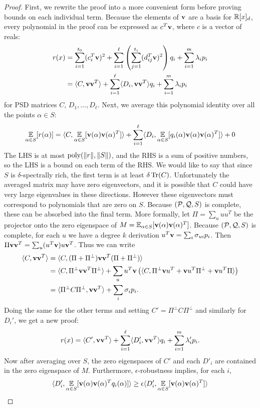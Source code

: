 \begin{proof}
First, we rewrite the proof into a more convenient form before proving bounds on each individual term. Because the elements of ${\bf v}$ are a basis for $\mathbb R[x]_d$, every polynomial in the proof can be expressed as $c^T{\bf v}$, where $c$ is a vector of reals:
\begin{align*} r(x) &= \sum_{i=1}^{t_0} (c_i^T{\bf v})^2 + \sum_{i=1}^\ell \left(\sum_{j=1}^{t_i} (d_{ij}^T{\bf v})^2\right)q_i + \sum_{i=1}^m \lambda_i p_i \\
&= \langle C, {\bf v}{\bf v}^T\rangle + \sum_{i=1}^\ell \langle D_i, {\bf v}{\bf v}^T\rangle q_i + \sum_{i=1}^m \lambda_i p_i
\end{align*}
for PSD matrices $C$, $D_1,\dots,D_\ell$. Next, we average this polynomial identity over all the points $\alpha \in S$:
\begin{align*}
\operatorname*{\mathbb{E}}_{\alpha \in S}[r(\alpha)] &= \langle C, \operatorname*{\mathbb{E}}_{\alpha \in S}[{\bf v}(\alpha){\bf v}(\alpha)^T]\rangle + \sum_{i=1}^\ell \langle D_i, \operatorname*{\mathbb{E}}_{\alpha \in S}[q_i(\alpha){\bf v}(\alpha){\bf v}(\alpha)^T]\rangle + 0 \\
\end{align*}
The LHS is at most $\operatorname{poly}(\|r\|, \|S\|)$, and the RHS is a sum of positive numbers, so the LHS is a bound on each term of the RHS. 
%
We would like to say that since $S$ is $\delta$-spectrally rich, the first term is at least $\delta \operatorname{Tr}(C)$. 
%
Unfortunately the averaged matrix may have zero eigenvectors, and it is possible that $C$ could have very large eigenvalues in these directions. 
%
However these eigenvectors must correspond to polynomials that are zero on $S$. Because $(\mathcal P, \mathcal Q, S)$ is complete, these can be absorbed into the final term. More formally, let $\Pi = \sum_u uu^T$ be the projector onto the zero eigenspace of $M = \operatorname*{\mathbb{E}}_{\alpha \in S}[{\bf v}(\alpha){\bf v}(\alpha)^T]$. Because $(\mathcal P, \mathcal Q, S)$ is complete, for each $u$ we have a degree $k$ derivation $u^T{\bf v} = \sum_i \sigma_{ui} p_i$. Then $\Pi {\bf v}{\bf v}^T = \sum_u (u^T{\bf v}) u{\bf v}^T$. Thus we can write
\begin{align*}
\langle C, {\bf v}{\bf v}^T\rangle &= \langle C, (\Pi + \Pi^\perp){\bf v}{\bf v}^T(\Pi + \Pi^\perp)\rangle \\
&= \langle C, \Pi^\perp {\bf v}{\bf v}^T \Pi^\perp\rangle + \sum_u u^T{\bf v}\left(\langle C, \Pi^\perp {\bf v}u^T + {\bf v}u^T\Pi^\perp + {\bf v}u^T\Pi\rangle\right) \\
&= \langle \Pi^\perp C \Pi^\perp, {\bf v}{\bf v}^T\rangle + \sum_i \sigma_i p_i.
\end{align*}
Doing the same for the other terms and setting $C' = \Pi^\perp C \Pi^\perp$ and similarly for $D_i'$, we get a new proof:
\[r(x) = \langle C', {\bf v}{\bf v}^T\rangle + \sum_{i=1}^\ell \langle D_i', {\bf v}{\bf v}^T\rangle q_i + \sum_{i=1}^m \lambda_i' p_i.\]
Now after averaging over $S$, the zero eigenspaces of $C'$ and each $D'_i$ are contained in the zero eigenspace of $M$. Furthermore, $\epsilon$-robustness implies, for each $i$,
\[\langle D_i', \operatorname*{\mathbb{E}}_{\alpha \in S}[{\bf v}(\alpha){\bf v}(\alpha)^Tq_i(\alpha)] \rangle \geq \epsilon\langle D_i', \operatorname*{\mathbb{E}}_{\alpha \in S}[{\bf v}(\alpha){\bf v}(\alpha)^T]\rangle\]


\end{proof}
